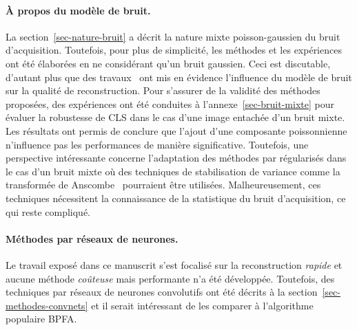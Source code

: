 \paragraph{\`A propos du modèle de bruit.} La section~\ref{sec-nature-bruit} a décrit la nature mixte poisson-gaussien du bruit d'acquisition. Toutefois, pour plus de simplicité, les méthodes et les expériences ont été élaborées en ne considérant qu'un bruit gaussien. Ceci est discutable, d'autant plus que des travaux~\cite{sanders2020inpainting} ont mis en évidence l'influence du modèle de bruit sur la qualité de reconstruction. Pour s'assurer de la validité des méthodes proposées, des expériences ont été conduites à l'annexe~\ref{sec-bruit-mixte} pour évaluer la robustesse de CLS dans le cas d'une image entachée d'un bruit mixte. Les résultats ont permis de conclure que l'ajout d'une composante poissonnienne n'influence pas les performances de manière significative. Toutefois, une perspective intéressante concerne l'adaptation des méthodes par  régularisés dans le cas d'un bruit mixte où des techniques de stabilisation de variance comme la transformée de Anscombe~\cite{anscombe1948transformation} pourraient être utilisées. Malheureusement, ces techniques nécessitent la connaissance de la statistique du bruit d'acquisition, ce qui reste compliqué.


\paragraph{Méthodes par réseaux de neurones.} Le travail exposé dans ce manuscrit s'est focalisé sur la reconstruction \emph{rapide} et aucune méthode \emph{coûteuse} mais performante n'a été développée. Toutefois, des techniques par réseaux de neurones convolutifs ont été décrits à la section~\ref{sec-methodes-convnets} et il serait intéressant de les comparer à l'algorithme populaire BPFA.






